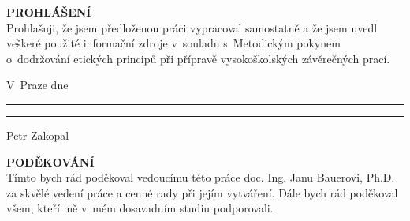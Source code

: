  \noindent \textcolor{ctublue}{{\Large{\textbf{\MakeTextUppercase{Prohlášení}}}}}\\
 			Prohlašuji, že jsem předloženou práci vypracoval samostatně a že jsem uvedl veškeré použité informační zdroje v~souladu s~Metodickým pokynem o~dodržování etických principů při přípravě vysokoškolských závěrečných prací.\\
 		\vspace{1.5cm}
		
	

 	\noindent	V~Praze dne \rule{3.5cm}{0.4pt} \hspace{6.6cm}  \rule{4cm}{0.4pt}
	
 	\hspace{12.65cm}Petr Zakopal


 		\vspace{14cm}
		
 	\noindent	\textcolor{ctublue}{{\Large{\textbf{\MakeTextUppercase{Poděkování}}}}}\\
 	Tímto bych rád poděkoval vedoucímu této práce doc. Ing. Janu Bauerovi, Ph.D. za skvělé vedení práce a cenné rady při jejím vytváření. Dále bych rád poděkoval všem, kteří mě v~mém dosavadním studiu podporovali.
